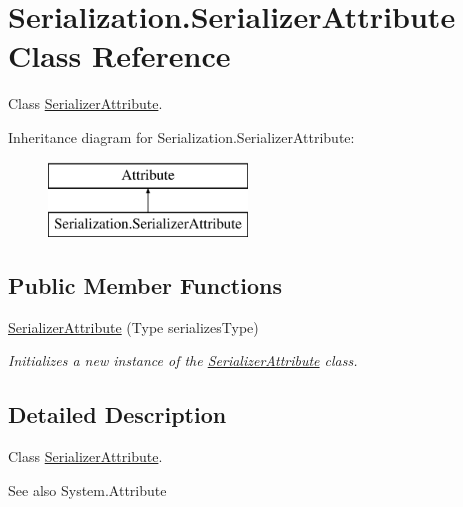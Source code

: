 \hypertarget{class_serialization_1_1_serializer_attribute}{}\section{Serialization.\+Serializer\+Attribute Class Reference}
\label{class_serialization_1_1_serializer_attribute}


Class \hyperlink{class_serialization_1_1_serializer_attribute}{Serializer\+Attribute}.  


Inheritance diagram for Serialization.\+Serializer\+Attribute\+:\begin{figure}[H]
\begin{center}
\leavevmode
\includegraphics[height=2.000000cm]{class_serialization_1_1_serializer_attribute}
\end{center}
\end{figure}
\subsection*{Public Member Functions}
\begin{DoxyCompactItemize}
\item 
\hyperlink{class_serialization_1_1_serializer_attribute_a475101d279677de97c551398f3f67530}{Serializer\+Attribute} (Type serializes\+Type)
\begin{DoxyCompactList}\small\item\em Initializes a new instance of the \hyperlink{class_serialization_1_1_serializer_attribute}{Serializer\+Attribute} class. \end{DoxyCompactList}\end{DoxyCompactItemize}


\subsection{Detailed Description}
Class \hyperlink{class_serialization_1_1_serializer_attribute}{Serializer\+Attribute}. 

\begin{DoxySeeAlso}{See also}
System.\+Attribute


\end{DoxySeeAlso}


